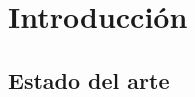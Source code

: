 
\chapter{Introducci\'on} %

\label{Chapter1} %


\newcommand{\keyword}[1]{\textbf{#1}}
\newcommand{\tabhead}[1]{\textbf{#1}}
\newcommand{\code}[1]{\texttt{#1}}
\newcommand{\file}[1]{\texttt{\bfseries#1}}
\newcommand{\option}[1]{\texttt{\itshape#1}}


\section{Estado del arte}


